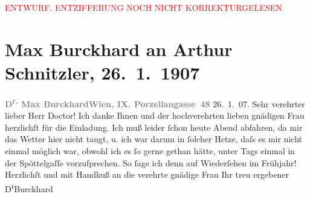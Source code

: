 
\begin{center}
            \textcolor{red}{ENTWURF. ENTZIFFERUNG NOCH NICHT KORREKTURGELESEN}
                      \end{center}
            
               \section[Max Burckhard an Arthur Schnitzler, 26. 1. 1907]{ Max Burckhard an Arthur Schnitzler, 26. 1. 1907}\nopagebreak{}\rehead{ }\begin{ledgroupsized}[t]{13cm}\normalsize\beginnumbering{} \toendnotes[C]{\smallbreak\pagebreak[2]} 
\toendnotes[C]{\smallbreak}\pstart
           \noindent{}{\pb}\textcolor{gray}{\textbf{D\textsuperscript{r.} Max Burckhard}}\hfill \textcolor{gray}{\textbf{Wien, IX. Porzellangasse 48}}{ }26. 1. 07.\pend
           \pstart
           \raggedleft{}\textcolor{gray}{\textbf{}}\hspace*{3.5em}\pend
           \pstart{}Sehr verehrter lieber Herr Doctor!\pend\pstart
           Ich danke Ihnen und der hochverehrten lieben gnädigen Frau herzlichſt für die Einladung. Ich
                    muß leider ſchon heute Abend abfahren, da mir das Wetter hier nicht taugt, u.
                    ich war darum in ſolcher Hetze, daſs es mir nicht einmal möglich war, obwohl ich
                    es ſo gerne gethan hätte, unter Tags einmal in der Spöttelgaſſe vorzuſprechen. So ſage ich denn auf Wiederſehen im
                    Frühjahr! Herzlichſt und mit Handkuß an die verehrte gnädige Frau Ihr treu ergebener\pend
           \pstart \spacefill\mbox{D\textsuperscript{r}Burckhard}\pend{}\endnumbering{}\end{ledgroupsized}  \newcommand{\dateiname}{L01654}\newcommand{\titel}{Max Burckhard an Arthur Schnitzler, 26. 1. 1907}\newcommand{\editorInnen}{Martin Anton Müller und Gerd-Hermann Susen}
      
